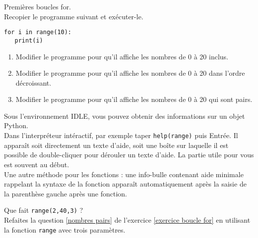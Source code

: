 \begin{exercice}\label{exercice boucle for} Premi\` eres boucles for.\\ 
Recopier le programme suivant et ex\' ecuter-le.
\begin{verbatim}
for i in range(10):
   print(i)
\end{verbatim}
\begin{enumerate}
\item Modifier le programme pour qu'il affiche les nombres de 0 \` a 20 inclus.
\item Modifier le programme pour qu'il affiche les nombres de 0 \` a 20 dans l'ordre d\' ecroissant.
\item \label{nombres pairs} Modifier le programme pour qu'il affiche les nombres de 0 \` a 20 qui sont pairs. 
\end{enumerate} 
\end{exercice}
\bigskip

\begin{remark}
Sous l'environnement IDLE, vous pouvez obtenir des informations sur un objet Python. \\
Dans l'interpréteur intéractif, par exemple taper \verb?help(range)? puis Entrée. Il apparaît soit directement un texte d'aide, soit une boîte sur laquelle il est possible de double-cliquer pour dérouler un texte d'aide. La partie utile pour vous est souvent au début.\\
Une autre m\' ethode pour les fonctions : une info-bulle contenant aide minimale rappelant la syntaxe de la fonction appara\^ it automatiquement apr\` es la saisie de la parenth\` ese gauche apr\` es une fonction.
\end{remark}


\begin{exercice}
Que fait \verb?range(2,40,3)? ?\\
Refaites la question \ref{nombres pairs} de l'exercice \ref{exercice boucle for} en utilisant la fonction \verb?range? avec trois param\` etres.
\end{exercice}
\bigskip



